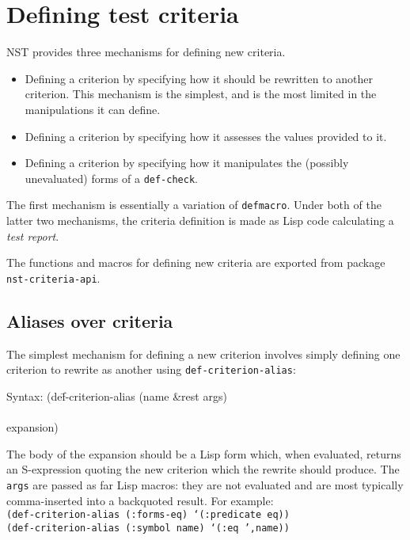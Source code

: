 
\section{Defining test criteria}
NST provides three mechanisms for defining new criteria.
\begin{itemize}
\item Defining a criterion by specifying how it should be rewritten to
  another criterion.  This mechanism is the simplest, and is the most
  limited in the manipulations it can define.
\item Defining a criterion by specifying how it assesses the values
  provided to it.
\item Defining a criterion by specifying how it manipulates the
  (possibly unevaluated) forms of a \texttt{def-check}.
\end{itemize}
The first mechanism is essentially a variation of \texttt{defmacro}.
Under both of the latter two mechanisms, the criteria definition is
made as Lisp code calculating a \emph{test report}.

The functions and macros for defining new criteria are exported from
package \texttt{nst-criteria-api}.

\subsection{Aliases over criteria}
\label{sec:def-criterion-alias}
The simplest mechanism for defining a new criterion involves simply
defining one criterion to rewrite as another using
\texttt{def-criterion-alias}:
%
{\ttfamily\begin{tabbing}
\textrm{Syntax: 
}(de\=f-criterion-alias (name \&rest args)
\\ \> [ documentation ]
\\ \> expansion)
\end{tabbing}}
The body of the expansion should be a Lisp form which, when evaluated,
returns an S-expression quoting the new criterion which the rewrite
should produce.  The \texttt{args} are passed as far Lisp macros: they
are not evaluated and are most typically comma-inserted into a
backquoted result.  For example:
\\ \texttt{(def-criterion-alias (:forms-eq) `(:predicate eq))}
\\ \texttt{(def-criterion-alias (:symbol name) `(:eq ',name))}

